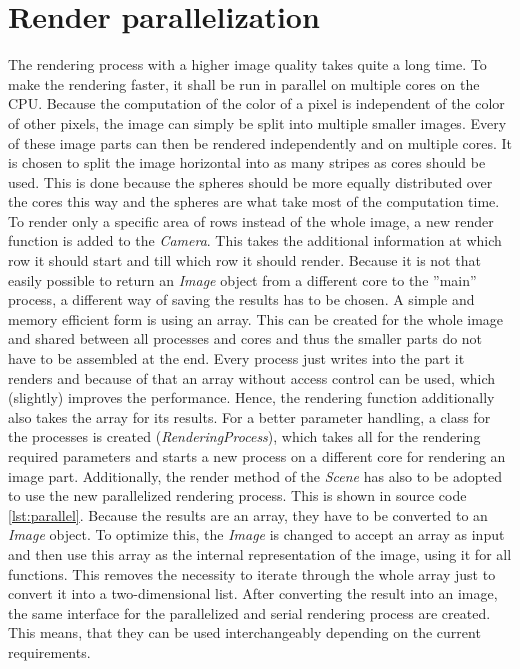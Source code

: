 \documentclass[12pt]{report}
\begin{document}
\chapter{Render parallelization}
The rendering process with a higher image quality takes quite a long time. To make the rendering faster, it shall be run in parallel on multiple cores on the CPU. Because the computation of the color of a pixel is independent of the color of other pixels, the image can simply be split into multiple smaller images. Every of these image parts can then be rendered independently and on multiple cores. It is chosen to split the image horizontal into as many stripes as cores should be used. This is done because the spheres should be more equally distributed over the cores this way and the spheres are what take most of the computation time. To render only a specific area of rows instead of the whole image, a new render function is added to the \textit{Camera}. This takes the additional information at which row it should start and till which row it should render. Because it is not that easily possible to return an \textit{Image} object from a different core to the ''main'' process, a different way of saving the results has to be chosen. A simple and memory efficient form is using an array. This can be created for the whole image and shared between all processes and cores and thus the smaller parts do not have to be assembled at the end. Every process just writes into the part it renders and because of that an array without access control can be used, which (slightly) improves the performance. Hence, the rendering function additionally also takes the array for its results. For a better parameter handling, a class for the processes is created (\textit{RenderingProcess}), which takes all for the rendering required parameters and starts a new process on a different core for rendering an image part. Additionally, the render method of the \textit{Scene} has also to be adopted to use the new parallelized rendering process. This is shown in source code \ref{lst:parallel}. Because the results are an array, they have to be converted to an \textit{Image} object. To optimize this, the \textit{Image} is changed to accept an array as input and then use this array as the internal representation of the image, using it for all functions. This removes the necessity to iterate through the whole array just to convert it into a two-dimensional list. After converting the result into an image, the same interface for the parallelized and serial rendering process are created. This means, that they can be used interchangeably depending on the current requirements.
\end{document}
